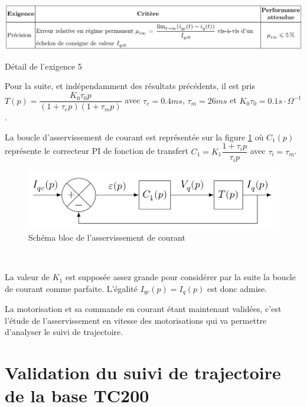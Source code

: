 \begin{table}[!ht]
\begin{center}
 \includegraphics[width=0.85\linewidth]{img/tab05.png}
 \end{center}
  \caption{Détail de l'exigence 5}
\label{tab05}
\end{table}

Pour la suite, et indépendamment des résultats précédents, il est pris
$T(p)=\dfrac{K_0\tau_0p}{(1+\tau_ep)(1+\tau_mp)}$ avec $\tau_e=0.4ms$,
$\tau_m=26ms$ et $K_0\tau_0=0.1s\cdot \Omega^{-1}$.

La boucle d'asservissement de courant est représentée sur la figure \ref{fig15} où $C_1(p)$ représente le correcteur PI de
fonction de transfert $C_1=K_1\dfrac{1+\tau_ip}{\tau_ip}$ avec $\tau_i=\tau_m$.

\begin{figure}[!ht]
\begin{center}
 \includegraphics[width=0.5\linewidth]{img/fig15.png}
 \end{center}
  \caption{Schéma bloc de l'asservissement de courant}
\label{fig15}
\end{figure}

\vspace{-0.5cm}


~\

La valeur de $K_1$ est supposée assez grande pour considérer par la suite la boucle de courant comme parfaite. L'égalité $I_{qc}(p)=I_{q}(p)$ est donc admise.

La motorisation et sa commande en courant étant maintenant validées, c'est l'étude de l'asservissement en vitesse des motorisations qui va permettre d'analyser le suivi de trajectoire.

\section{Validation du suivi de trajectoire de la base TC200}

